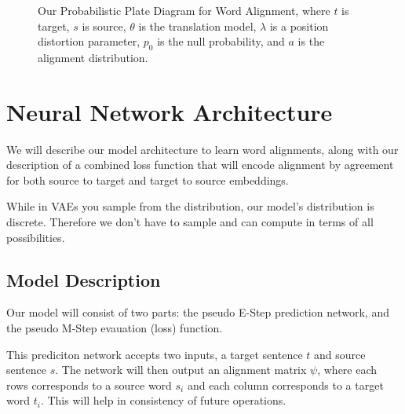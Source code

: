 \documentclass[twoside,twocolumn]{article}
\begin{document}
\begin{figure}
\centering
{}
\caption{Our Probabilistic Plate Diagram for Word Alignment, where $t$ is target, $s$ is source, $\theta$ is the translation model, $\lambda$ is a position distortion parameter, $p_0$ is the null probability, and $a$ is the alignment distribution.}
\end{figure}

\section{Neural Network Architecture}

We will describe our model architecture to learn word alignments, along with our description of a combined loss function that will encode alignment by agreement for both source to target and target to source embeddings.

While in VAEs you sample from the distribution, our model's distribution is discrete. Therefore we don’t have to sample and can compute in terms of all possibilities.

\subsection{Model Description}

Our model will consist of two parts: the pseudo E-Step prediction network, and the pseudo M-Step evauation (loss) function.

This prediciton network accepts two inputs, a target sentence $t$ and source sentence $s$. The network will then output an alignment matrix $\psi$, where each rows corresponds to a source word $s_i$ and each column corresponds to a target word $t_i$. This will help in consistency of future operations.
\end{document}
